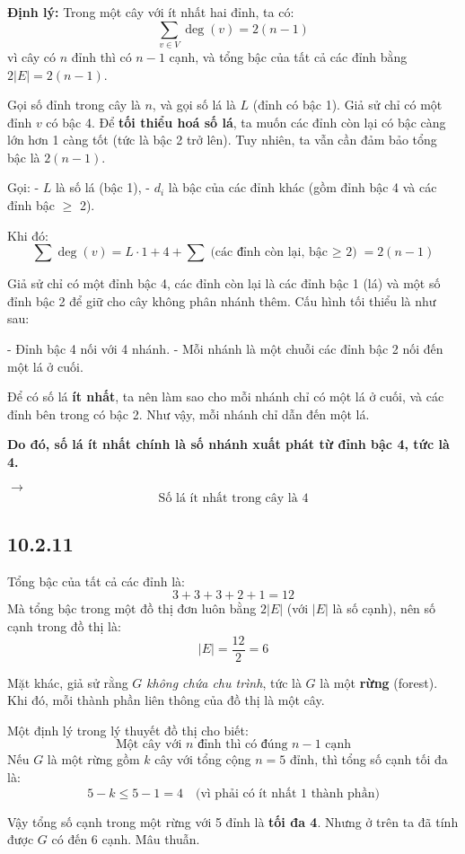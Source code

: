 \documentclass{article}
\begin{document}
	\textbf{Định lý:} Trong một cây với ít nhất hai đỉnh, ta có:
	\[
	\sum_{v \in V} \deg(v) = 2(n - 1)
	\]
	vì cây có $n$ đỉnh thì có $n - 1$ cạnh, và tổng bậc của tất cả các đỉnh bằng $2|E| = 2(n-1)$.
	
	Gọi số đỉnh trong cây là $n$, và gọi số lá là $L$ (đỉnh có bậc 1).  
	Giả sử chỉ có một đỉnh $v$ có bậc 4. Để \textbf{tối thiểu hoá số lá}, ta muốn các đỉnh còn lại có bậc càng lớn hơn 1 càng tốt (tức là bậc 2 trở lên). Tuy nhiên, ta vẫn cần đảm bảo tổng bậc là $2(n - 1)$.
	
	Gọi:
	- \( L \) là số lá (bậc 1),
	- \( d_i \) là bậc của các đỉnh khác (gồm đỉnh bậc 4 và các đỉnh bậc $\geq$ 2).
	
	Khi đó:
	\[
	\sum \deg(v) = L \cdot 1 + 4 + \sum \text{(các đỉnh còn lại, bậc $\geq$ 2)} = 2(n - 1)
	\]
	
	Giả sử chỉ có một đỉnh bậc 4, các đỉnh còn lại là các đỉnh bậc 1 (lá) và một số đỉnh bậc 2 để giữ cho cây không phân nhánh thêm. Cấu hình tối thiểu là như sau:
	
	- Đỉnh bậc 4 nối với 4 nhánh.
	- Mỗi nhánh là một chuỗi các đỉnh bậc 2 nối đến một lá ở cuối.
	
	Để có số lá \textbf{ít nhất}, ta nên làm sao cho mỗi nhánh chỉ có một lá ở cuối, và các đỉnh bên trong có bậc 2. Như vậy, mỗi nhánh chỉ dẫn đến một lá.
	
	\textbf{Do đó, số lá ít nhất chính là số nhánh xuất phát từ đỉnh bậc 4, tức là 4.}
	
	$\rightarrow$
	\[
	\boxed{\text{Số lá ít nhất trong cây là } 4}
	\]
	
	\subsection*{10.2.11}
	Tổng bậc của tất cả các đỉnh là:
	\[
	3 + 3 + 3 + 2 + 1 = 12
	\]
	Mà tổng bậc trong một đồ thị đơn luôn bằng $2|E|$ (với $|E|$ là số cạnh), nên số cạnh trong đồ thị là:
	\[
	|E| = \frac{12}{2} = 6
	\]
	
	Mặt khác, giả sử rằng $G$ \textit{không chứa chu trình}, tức là $G$ là một \textbf{rừng} (forest). Khi đó, mỗi thành phần liên thông của đồ thị là một cây.
	
	Một định lý trong lý thuyết đồ thị cho biết:
	\[
	\text{Một cây với } n \text{ đỉnh thì có đúng } n - 1 \text{ cạnh}
	\]
	Nếu $G$ là một rừng gồm $k$ cây với tổng cộng $n = 5$ đỉnh, thì tổng số cạnh tối đa là:
	\[
	5 - k \leq 5 - 1 = 4 \quad \text{(vì phải có ít nhất 1 thành phần)}
	\]
	
	Vậy tổng số cạnh trong một rừng với 5 đỉnh là \textbf{tối đa 4}.  
	Nhưng ở trên ta đã tính được $G$ có đến $6$ cạnh. Mâu thuẫn.
	
\end{document}

